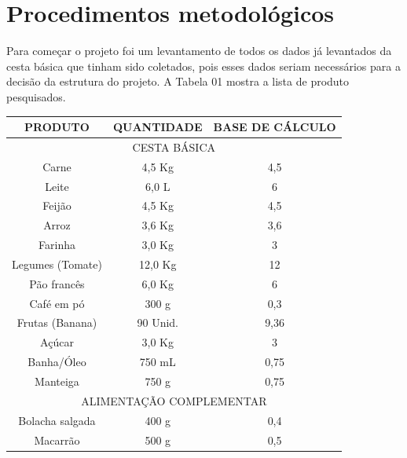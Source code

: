 \documentclass{ifto-tex}
\begin{document}
	
	
\chapter{Procedimentos metodológicos}
	
Para começar o projeto foi um levantamento de todos os dados já levantados da cesta básica que tinham sido coletados, pois esses dados seriam necessários para a decisão da estrutura do projeto. A Tabela 01 mostra a lista de produto pesquisados.
	\begin{longtable}{|c|c|c|} 
			\hline
			PRODUTO           & QUANTIDADE         & BASE DE CÁLCULO \\
			\hline
			\multicolumn{3}{|c|}{CESTA BÁSICA}                         \\
			\hline
			Carne             & 4,5 Kg             & 4,5             \\
			\hline
			Leite             & 6,0 L              & 6               \\
			\hline
			Feijão            & 4,5 Kg             & 4,5             \\
			\hline
			Arroz             & 3,6 Kg             & 3,6             \\
			\hline
			Farinha           & 3,0 Kg             & 3               \\
			\hline
			Legumes (Tomate)  & 12,0 Kg            & 12              \\
			\hline
			Pão francês       & 6,0 Kg             & 6               \\
			\hline
			Café em pó        & 300 g              & 0,3             \\
			\hline
			Frutas (Banana)   & 90 Unid.           & 9,36            \\
			\hline
			Açúcar            & 3,0 Kg             & 3               \\
			\hline
			Banha/Óleo        & 750 mL             & 0,75            \\
			\hline
			Manteiga          & 750 g              & 0,75            \\
			\hline
			\multicolumn{3}{|c|}{ALIMENTAÇÃO COMPLEMENTAR}             \\
			\hline
			Bolacha salgada   & 400 g              & 0,4             \\
			\hline
			Macarrão          & 500 g              & 0,5             \\

\end{longtable}
\end{document}
